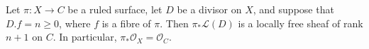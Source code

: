 Let $\pi: X \rightarrow C$ be a ruled surface, let $D$ be a divisor on $X$, and suppose that $D.f = n \geqslant 0$, where $f$ is a fibre of $\pi$. Then $\pi_*\mathcal{L}(D)$ is a locally free sheaf of rank $n + 1$ on $C$. In particular, $\pi_*\mathcal{O}_X = \mathcal{O}_C$.
